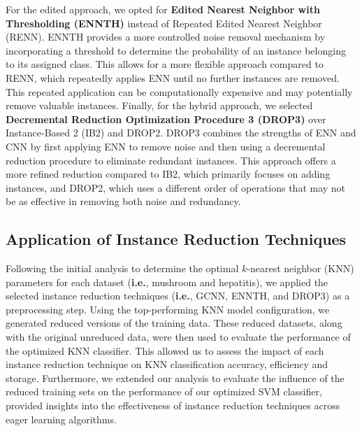 For the edited approach, we opted for \textbf{Edited Nearest Neighbor with Thresholding (ENNTH)} \cite{Wilson2000,ENNTH}
instead of Repeated Edited Nearest Neighbor (RENN). ENNTH provides a more controlled noise removal mechanism by
incorporating a threshold to determine the probability of an instance belonging to its assigned class. 
This allows for a more flexible approach compared to RENN, which repeatedly applies ENN until no further 
instances are removed. This repeated application can be computationally expensive and may potentially 
remove valuable instances. Finally, for the hybrid approach, we selected 
\textbf{Decremental Reduction Optimization Procedure 3 (DROP3)} \cite{Wilson2000}
over Instance-Based 2 (IB2) and DROP2. DROP3 combines the strengths of ENN and CNN by first applying 
ENN to remove noise and then using a decremental reduction procedure to eliminate redundant instances.
This approach offers a more refined reduction compared to IB2, which primarily focuses on adding instances,
and DROP2, which uses a different order of operations that may not be as effective in removing both noise and
redundancy.


\subsection*{Application of Instance Reduction Techniques}

Following the initial analysis to determine the optimal $k$-nearest neighbor (KNN)
parameters for each dataset (\textbf{i.e.}, mushroom and hepatitis), we applied the selected instance reduction techniques
(\textbf{i.e.}, GCNN, ENNTH, and DROP3) as a preprocessing step. Using the top-performing KNN model configuration,
we generated reduced versions of the training data. These reduced datasets, along with the original
unreduced data, were then used to evaluate the performance of the optimized KNN classifier. 
This allowed us to assess the impact of each instance reduction technique on KNN classification 
accuracy, efficiency and storage. Furthermore, we extended our analysis to evaluate the influence of the reduced training sets
on the performance of our optimized SVM classifier, provided insights into the effectiveness of instance reduction techniques across eager learning algorithms.


